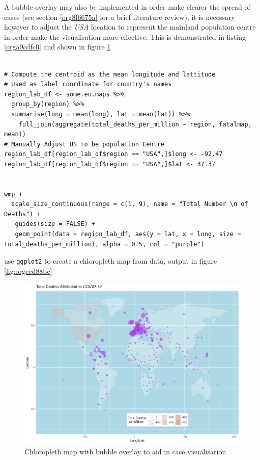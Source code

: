 \documentclass[11pt]{article}
\begin{document}
A bubble overlay may also be implemented in order make clearer the spread of cases (see section \ref{org8f6675a} for a brief literature review), it is necessary however to adjust the \emph{USA} location to represent the mainland population centre in order make the visualisation more effective. This is demonstrated in listing \ref{orga9cdfc0} and shown in figure \ref{fig:org7ffe5fb}

\begin{listing}[htbp]
\begin{verbatim}

# Compute the centroid as the mean longitude and lattitude
# Used as label coordinate for country's names
region_lab_df <- some.eu.maps %>%
  group_by(region) %>%
  summarise(long = mean(long), lat = mean(lat)) %>%
    full_join(aggregate(total_deaths_per_million ~ region, fatalmap, mean))
# Manually Adjust US to be population Centre
region_lab_df[region_lab_df$region == "USA",]$long <- -92.47
region_lab_df[region_lab_df$region == "USA",]$lat <- 37.37


wmp +
  scale_size_continuous(range = c(1, 9), name = "Total Number \n of Deaths") +
   guides(size = FALSE) +
   geom_point(data = region_lab_df, aes(y = lat, x = long, size = total_deaths_per_million), alpha = 0.5, col = "purple")
\end{verbatim}
\caption{\label{orga9cdfc0}use \texttt{ggplot2} to create a chloropleth map from data, output in figure \ref{fig:orgced88bc}}
\end{listing}

\begin{figure}[htbp]
\centering
\includegraphics[width=16cm]{FirstChAllbub.png}
\caption{\label{fig:org7ffe5fb}Chloropleth map with bubble overlay to aid in case visualisation}
\end{figure}
\end{document}
